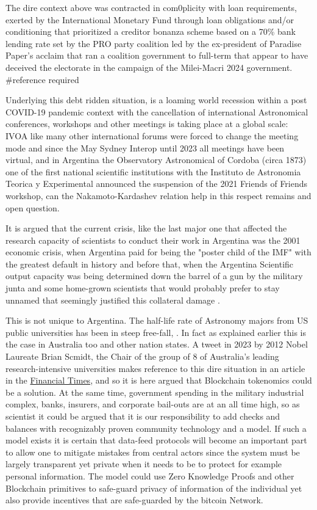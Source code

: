 \documentclass[final,5p,times,twocolumn,authoryear]{elsarticle}
\begin{document}
The dire context above was contracted in com0plicity with loan requirements, exerted by the International Monetary Fund through loan obligations and/or conditioning that prioritized a creditor bonanza scheme based on a 70\% bank lending rate set by the PRO party coalition led by the ex-president of Paradise Paper's acclaim that ran a coalition government to full-term that appear to have deceived the electorate in the campaign of the Milei-Macri 2024 government. #reference required

Underlying this debt ridden situation, is a loaming world recession within a post COVID-19 pandemic context with the cancellation of international Astronomical conferences, workshops and other meetings is taking place at a global scale: IVOA like many other international forums were forced to change the meeting mode and since the May Sydney Interop until 2023 all meetings have been virtual, and in Argentina the Observatory Astronomical of Cordoba (circa 1873) one of the first national scientific institutions with the Instituto de Astronomia Teorica y Experimental announced the suspension of the 2021 Friends of Friends workshop, can the Nakamoto-Kardashev relation help in this respect remains and open question.  

It is argued that the current crisis, like the last major one that affected the research capacity of scientists to conduct their work in Argentina was the 2001 economic crisis, when Argentina paid for being the "poster child of the IMF" with the greatest default in history and before that, when the Argentina Scientific output capacity was being determined down the barrel of a gun by the military junta and some home-grown scientists that would probably prefer to stay unnamed that seemingly justified this collateral damage \cite{levato1976}.

This is not unique to Argentina. The half-life rate of Astronomy majors from US public universities has been in steep free-fall,  \cite{milo_2018}. In fact as explained earlier this is the case in Australia too and other nation states. A tweet in 2023 by 2012 Nobel Laureate Brian Scmidt, the Chair of the group of 8 of Australia's  leading research-intensive universities makes reference to this dire situation in an article in the \href{https://t.co/RUEENvowqw}{Financial Times}, and so it is here argued that Blockchain tokenomics could be a solution.  At the same time, government spending in the military industrial complex, banks, insurers, and corporate bail-outs are at an all time high, so as scientist it could be argued that it is our responsibility to add checks and balances with recognizably proven community technology and a model. 
%
If such a model exists it is certain that data-feed protocols will become an important part to allow one to mitigate mistakes from central actors since the system must be largely transparent yet private when it needs to be to protect for example personal information. The model could use Zero Knowledge Proofs and other Blockchain primitives to safe-guard privacy of information of the individual yet also provide incentives that are safe-guarded by the bitcoin Network. 
   
\end{document}
